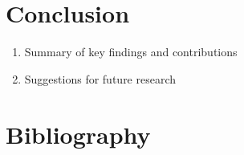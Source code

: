 \documentclass[11pt]{article}
\begin{document}
\section{Conclusion}

\vspace{.1in}

\begin{enumerate}
    \item Summary of key findings and contributions
    \item Suggestions for future research
\end{enumerate}


\section{Bibliography}

\vspace{.1in}
\end{document}
